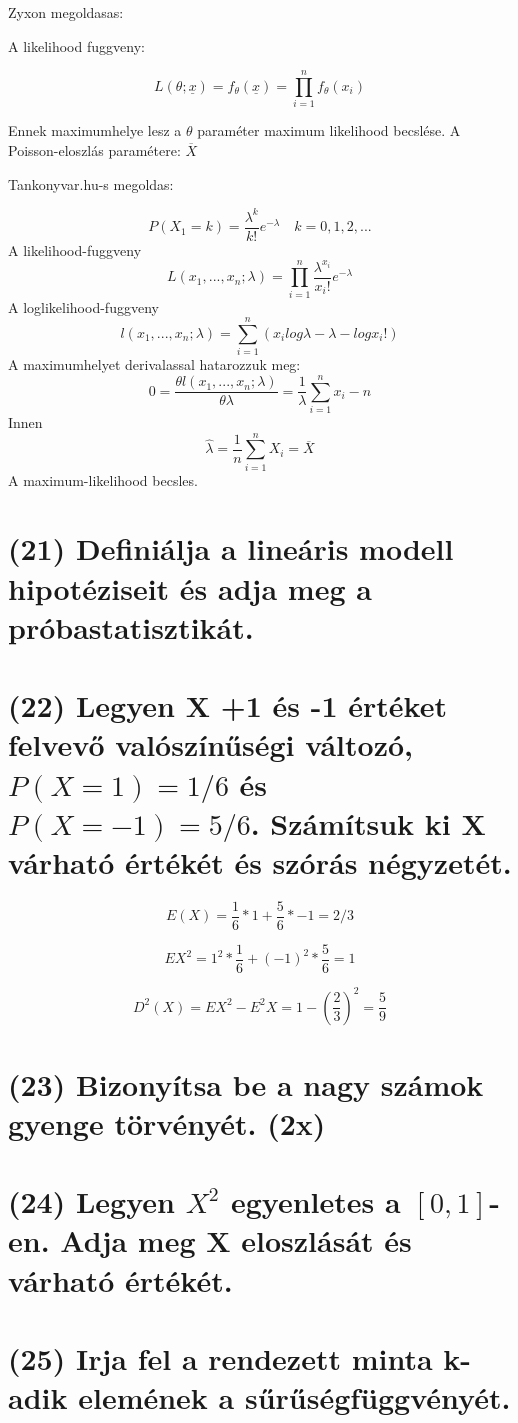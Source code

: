 \documentclass[12p]{article}
\begin{document}
Zyxon megoldasas:

A likelihood fuggveny:

$$L(\theta;\underline{x}) = f_{\theta}(\underline{x}) = \prod^n_{i=1} f_{\theta}(x_i)$$

Ennek maximumhelye lesz a $\theta$ paraméter maximum likelihood becslése. A Poisson-eloszlás paramétere: $\overline{X}$

Tankonyvar.hu-s megoldas:

$$P(X_1 = k) = \frac{\lambda^k}{k!}e^{-\lambda}\quad k=0, 1, 2, ...$$
A likelihood-fuggveny
$$L(x_1, ..., x_n;\lambda)=\prod^n_{i=1}\frac{\lambda^{x_i}}{x_i!}e^{-\lambda}$$
A loglikelihood-fuggveny
$$l(x_1, ..., x_n;\lambda) = \sum^n_{i=1}(x_i log \lambda - \lambda - log x_i!)$$
A maximumhelyet derivalassal hatarozzuk meg:
$$0 = \frac{\theta l(x_1, ..., x_n;\lambda)}{\theta \lambda} = \frac{1}{\lambda} \sum^n_{i=1} x_i - n$$
Innen
$$\hat{\lambda} = \frac{1}{n} \sum^n_{i=1} X_i = \overline{X}$$
A maximum-likelihood becsles.

\section{(21) Definiálja a lineáris modell hipotéziseit és adja meg a próbastatisztikát.}

\section{(22) Legyen X +1 és -1 értéket felvevő valószínűségi változó, $P(X = 1) = 1/6$ és $P(X = -1) = 5/6$. Számítsuk ki X várható értékét és szórás négyzetét.}

$$ E(X) = \frac{1}{6} * 1 + \frac{5}{6} * -1 = 2/3$$

$$ EX^2 = 1^2 * \frac{1}{6} + (-1)^2 * \frac{5}{6} = 1$$

$$ D^2(X) = EX^2 - E^2X = 1 - \left(\frac{2}{3}\right)^2 = \frac{5}{9}$$

\section{(23) Bizonyítsa be a nagy számok gyenge törvényét. (2x)}

\section{(24) Legyen $X^2$ egyenletes a $[0, 1]$-en. Adja meg X eloszlását és várható értékét.}

\section{(25) Irja fel a rendezett minta k-adik elemének a sűrűségfüggvényét.}
\end{document}
